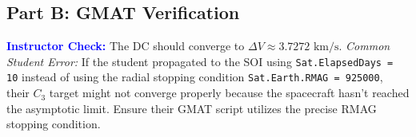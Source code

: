 \documentclass[12pt]{article}
\begin{document}
\subsection*{Part B: GMAT Verification}
\textcolor{blue}{\textbf{Instructor Check:}} The DC should converge to $\Delta V \approx 3.7272 \text{ km/s}$. 
\textit{Common Student Error:} If the student propagated to the SOI using \texttt{Sat.ElapsedDays = 10} instead of using the radial stopping condition \texttt{Sat.Earth.RMAG = 925000}, their $C_3$ target might not converge properly because the spacecraft hasn't reached the asymptotic limit. Ensure their GMAT script utilizes the precise RMAG stopping condition.
\end{document}
